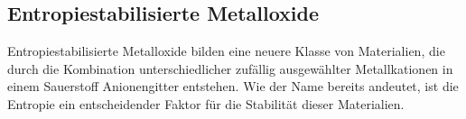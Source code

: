 \subsection{Entropiestabilisierte Metalloxide}\label{subsec:hochentropische-metalloxide}
Entropiestabilisierte Metalloxide bilden eine neuere Klasse von Materialien, die durch die Kombination unterschiedlicher
zufällig ausgewählter Metallkationen in einem Sauerstoff Anionengitter entstehen.
Wie der Name bereits andeutet, ist die Entropie ein entscheidender Faktor für die Stabilität dieser Materialien.